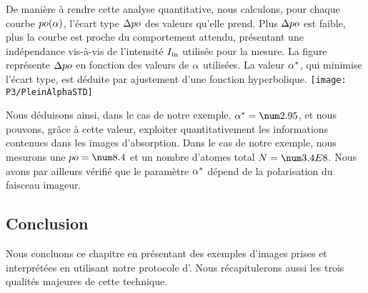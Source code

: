 \casse

\noindent De manière à rendre cette analyse quantitative, nous calculons, pour chaque courbe ${{ po}}({\alpha})$, l'écart type ${\Delta { po}}$ des valeurs qu'elle prend. Plus ${\Delta { po}}$ est faible, plus la courbe est proche du comportement attendu, \cad présentant une indépendance vis-à-vis de l'intensité ${{I}_{\rm in}}$ utilisée pour la mesure. La figure~ représente ${\Delta { po}}$ en fonction des valeurs de ${\alpha}$ utilisées. La valeur ${{\alpha}^{*}}$, qui minimise l'écart type, est déduite par ajustement d'une fonction hyperbolique. 
%
\bfighs
\texttt{[image: P3/PleinAlphaSTD]}
\label{fig:PleinAlphaSTD}
\efigh

Nous déduisons ainsi, dans le cas de notre exemple, $\Imperf = \val{2.95}$, et nous pouvons, grâce à cette valeur, exploiter quantitativement les informations contenues dans les images d'absorption. Dans le cas de notre exemple, nous mesurons une \pro $\OptProfMax = \val{8.4}$ et un nombre d'atomes total $N=\val{3.4E{8}}$.
Nous avons par ailleurs vérifié que le paramètre ${{\alpha}^{*}}$ dépend de la polarisation du faisceau imageur.


\subsection{Conclusion}\label{sec:ImageNuageDense}
Nous concluons ce chapitre en présentant des exemples d'images prises et interprétées en utilisant notre protocole d'\ipadrfs. Nous récapitulerons aussi les trois qualités majeures de cette technique.

